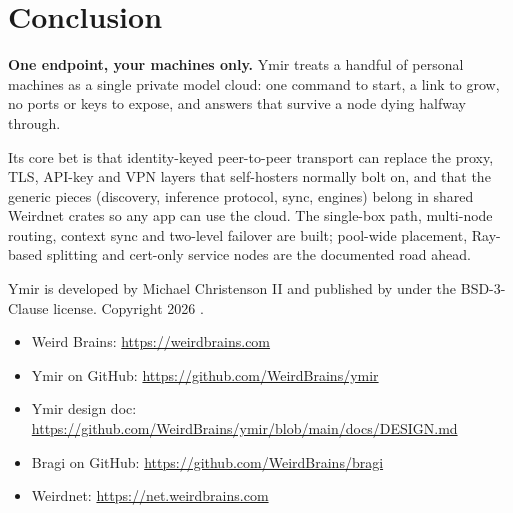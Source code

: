 \section{Conclusion}\label{sec:conclusion}

\begin{callout}
\textbf{One endpoint, your machines only.} Ymir treats a handful of personal machines as a single
private model cloud: one command to start, a link to grow, no ports or keys to expose, and answers
that survive a node dying halfway through.
\end{callout}

Its core bet is that identity-keyed peer-to-peer transport can replace the proxy, TLS, API-key and
VPN layers that self-hosters normally bolt on, and that the generic pieces (discovery, inference
protocol, sync, engines) belong in shared Weirdnet crates so any app can use the cloud. The
single-box path, multi-node routing, context sync and two-level failover are built; pool-wide
placement, Ray-based splitting and cert-only service nodes are the documented road ahead.

Ymir is developed by Michael Christenson II and published by \WB{} under the BSD-3-Clause license.
Copyright 2026 \WB.

\begin{itemize}
  \item Weird Brains: \url{https://weirdbrains.com}
  \item Ymir on GitHub: \url{https://github.com/WeirdBrains/ymir}
  \item Ymir design doc: \url{https://github.com/WeirdBrains/ymir/blob/main/docs/DESIGN.md}
  \item Bragi on GitHub: \url{https://github.com/WeirdBrains/bragi}
  \item Weirdnet: \url{https://net.weirdbrains.com}
\end{itemize}
